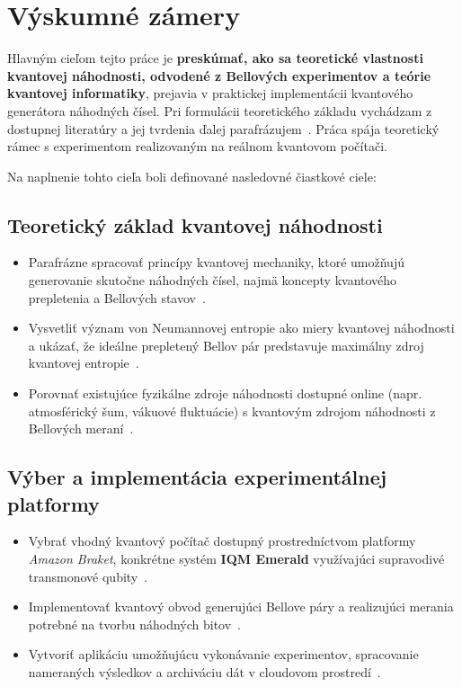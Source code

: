 \chapter{Výskumné zámery}\label{ch:ciele}

Hlavným cieľom tejto práce je \textbf{preskúmať, ako sa teoretické vlastnosti kvantovej náhodnosti, odvodené z Bellových experimentov a teórie kvantovej informatiky}, prejavia v praktickej implementácii kvantového generátora náhodných čísel. Pri formulácii teoretického základu vychádzam z dostupnej literatúry a jej tvrdenia ďalej parafrázujem~\cite{PhysicsPhysiqueFizika.1.195, nielsen_chuang_2010}. Práca spája teoretický rámec s experimentom realizovaným na reálnom kvantovom počítači.

Na naplnenie tohto cieľa boli definované nasledovné čiastkové ciele:


\section{Teoretický základ kvantovej náhodnosti}\label{sec:teoreticka-analyza}
\begin{itemize}
  \item Parafrázne spracovať princípy kvantovej mechaniky, ktoré umožňujú generovanie skutočne náhodných čísel, najmä koncepty kvantového prepletenia a Bellových stavov~\cite{shalm2015strong}.
  \item Vysvetliť význam von Neumannovej entropie ako miery kvantovej náhodnosti a ukázať, že ideálne prepletený Bellov pár predstavuje maximálny zdroj kvantovej entropie~\cite{nielsen_chuang_2010}.
  \item Porovnať existujúce fyzikálne zdroje náhodnosti dostupné online (napr. atmosférický šum, vákuové fluktuácie) s kvantovým zdrojom náhodnosti z Bellových meraní~\cite{randomorg, quantum_numbers_anu}.
\end{itemize}

\section{Výber a implementácia experimentálnej platformy}\label{sec:vyber-platformy}
\begin{itemize}
  \item Vybrať vhodný kvantový počítač dostupný prostredníctvom platformy \textit{Amazon Braket}, konkrétne systém \textbf{IQM Emerald} využívajúci supravodivé transmonové qubity~\cite{IQMEmerald}.
  \item Implementovať kvantový obvod generujúci Bellove páry a realizujúci merania potrebné na tvorbu náhodných bitov~\cite{nielsen_chuang_2010}.
  \item Vytvoriť aplikáciu umožňujúcu vykonávanie experimentov, spracovanie nameraných výsledkov a archiváciu dát v cloudovom prostredí~\cite{rubio2017beginning}.
\end{itemize}

